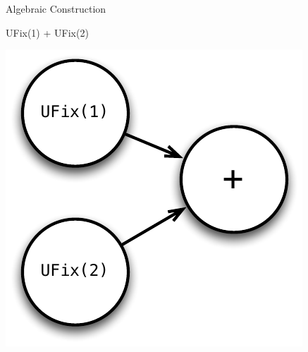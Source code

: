 \documentclass[xcolor=pdflatex,dvipsnames,table]{beamer}
\begin{document}
\begin{frame}[fragile]{Algebraic Construction}

\begin{scala}
UFix(1) + UFix(2)
\end{scala}

\begin{center}
\includegraphics[height=0.7\textheight]{figs/add.pdf} 
\end{center}

\end{frame}
\end{document}

